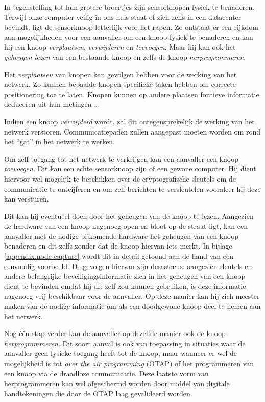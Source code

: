 In tegenstelling tot hun grotere broertjes zijn sensorknopen fysiek te
benaderen. Terwijl onze computer veilig in ons huis staat of zich zelfs in een
datacenter bevindt, ligt de sensorknoop letterlijk voor het rapen. Zo ontstaat
er een rijkdom aan mogelijkheden voor een aanvaller om een knoop fysiek te
benaderen en kan hij een knoop \emph{verplaatsen}, \emph{verwijderen} en
\emph{toevoegen}. Maar hij kan ook het \emph{geheugen lezen} van een bestaande
knoop en zelfs de knoop \emph{herprogrammeren}.

Het \emph{verplaatsen} van knopen kan gevolgen hebben voor de werking van het
netwerk. Zo kunnen bepaalde knopen specifieke taken hebben om correcte
positionering toe te laten. Knopen kunnen op andere plaatsen foutieve
informatie deduceren uit hun metingen \dots

Indien een knoop \emph{verwijderd} wordt, zal dit ontegensprekelijk de werking
van het netwerk verstoren. Communicatiepaden zullen aangepast moeten worden om
rond het ``gat'' in het netwerk te werken.

Om zelf toegang tot het netwerk te verkrijgen kan een aanvaller een knoop
\emph{toevoegen}. Dit kan een echte sensorknoop zijn of een gewone computer.
Hij dient hiervoor wel mogelijk te beschikken over de cryptografische sleutels
om de communicatie te ontcijferen en om zelf berichten te versleutelen
vooraleer hij deze kan versturen.

Dit kan hij eventueel doen door het geheugen van de knoop te lezen. Aangezien
de hardware van een knoop nagenoeg open en bloot op de straat ligt, kan een
aanvaller met de nodige bijkomende hardware het geheugen van een knoop
benaderen en dit zelfs zonder dat de knoop hiervan iets merkt. In bijlage
\ref{appendix:node-capture} wordt dit in detail getoond aan de hand van een
eenvoudig voorbeeld. De gevolgen hiervan zijn desastreus: aangezien sleutels en
andere belangrijke beveiligingsinformatie zich in het geheugen van een knoop
dient te bevinden omdat hij dit zelf zou kunnen gebruiken, is deze informatie
nagenoeg vrij beschikbaar voor de aanvaller. Op deze manier kan hij zich
meester maken van de nodige informatie om als een doodgewone knoop deel te
nemen aan het netwerk.

Nog \'e\'en stap verder kan de aanvaller op dezelfde manier ook de knoop
\emph{herprogrammeren}. Dit soort aanval is ook van toepassing in situaties
waar de aanvaller geen fysieke toegang heeft tot de knoop, maar wanneer er wel
de mogelijkheid is tot \emph{over the air programming} (OTAP) of het
programmeren van een knoop via de draadloze communicatie. Deze laatste vorm van
herprogrammeren kan wel afgeschermd worden door middel van digitale
handtekeningen die door de OTAP laag gevalideerd worden.

